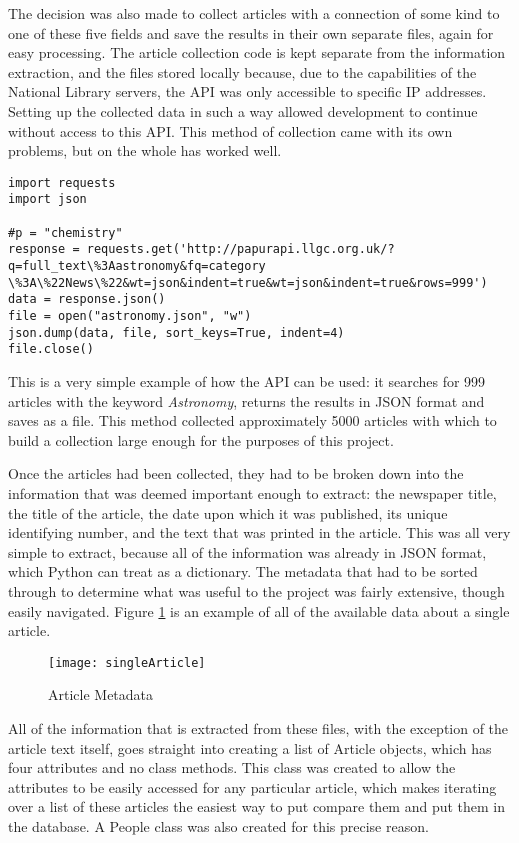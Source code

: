 \documentclass[11pt,a4paper]{book}
\begin{document}
The decision was also made to collect articles with a connection of some kind to one of these five fields and save the results in their own separate files, again for easy processing. The article collection code is kept separate from the information extraction, and the files stored locally because, due to the capabilities of the National Library servers, the API was only accessible to specific IP addresses. Setting up the collected data in such a way allowed development to continue without access to this API. This method of collection came with its own problems, but on the whole has worked well.
\begin{lstlisting}[caption={Information Collection}]
import requests	
import json

#p = "chemistry"
response = requests.get('http://papurapi.llgc.org.uk/?q=full_text\%3Aastronomy&fq=category
\%3A\%22News\%22&wt=json&indent=true&wt=json&indent=true&rows=999')
data = response.json()
file = open("astronomy.json", "w")
json.dump(data, file, sort_keys=True, indent=4)
file.close()
\end{lstlisting}
This is a very simple example of how the API can be used: it searches for 999 articles with the keyword \textit{Astronomy}, returns the results in JSON format and saves as a file. This method collected approximately 5000 articles with which to build a collection large enough for the purposes of this project. 

Once the articles had been collected, they had to be broken down into the information that was deemed important enough to extract: the newspaper title, the title of the article, the date upon which it was published, its unique identifying number, and the text that was printed in the article. This was all very simple to extract, because all of the information was already in JSON format, which Python can treat as a dictionary. The metadata that had to be sorted through to determine what was useful to the project was fairly extensive, though easily navigated. Figure \ref{fig:artmet} is an example of all of the available data about a single article.
\begin{figure}[h]
	\centerline{\texttt{[image: singleArticle]}}
	\caption{Article Metadata}
	\label{fig:artmet}
\end{figure}
All of the information that is extracted from these files, with the exception of the article text itself, goes straight into creating a list of Article objects, which has four attributes and no class methods. This class was created to allow the attributes to be easily accessed for any particular article, which makes iterating over a list of these articles the easiest way to put compare them and put them in the database. A People class was also created for this precise reason.
\end{document}
